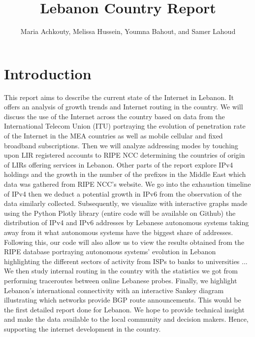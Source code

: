 \documentclass[a4paper,titlepage]{article}
\title{Lebanon Country Report}
\author{Maria Achkouty, Melissa Hussein, Youmna Bahout, and Samer Lahoud}
\begin{document}
\maketitle

\begin{abstract}

\end{abstract}

\section{Introduction}
This report aims to describe the current state of the Internet in Lebanon. It offers an analysis of growth trends and Internet routing in the country.
We will discuss the use of the Internet across the country based on data from the International Telecom Union (ITU) portraying the evolution of penetration rate of the Internet in the MEA countries as well as mobile cellular and fixed broadband subscriptions.
Then we will analyze addressing modes by touching upon LIR registered accounts to RIPE NCC determining the countries of origin of LIRs offering services in Lebanon.
Other parts of the report explore IPv4 holdings and the growth in the number of the prefixes in the Middle East which data was gathered from RIPE NCC’s website. We go into the exhaustion timeline of IPv4 then we deduct a potential growth in IPv6 from the observation of the data similarly collected.
Subsequently, we visualize with interactive graphs made using the Python Plotly library (entire code will be available on Github) the distribution of IPv4 and IPv6 addresses by Lebanese autonomous systems taking away from it what autonomous systems have the biggest share of addresses.
Following this, our code will also allow us to view the results obtained from the RIPE database portraying autonomous systems’ evolution in Lebanon highlighting the different sectors of activity from ISPs to banks to universities ...
We then study internal routing in the country with the statistics we got from performing traceroutes between online Lebanese probes.
Finally, we highlight Lebanon’s international connectivity with an interactive Sankey diagram illustrating which networks provide BGP route announcements.
This would be the first detailed report done for Lebanon. We hope to provide technical insight and make the data available to the local community and decision makers. Hence, supporting the internet development in the country.
 
\end{document}
